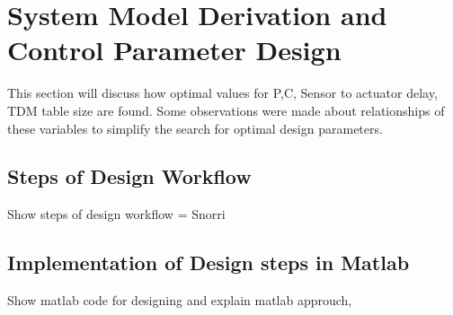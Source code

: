 \section{System Model Derivation and Control Parameter Design}

This section will discuss how optimal values for P,C, Sensor to actuator delay, TDM table size are found. Some observations were made about relationships of these variables to simplify the search for optimal design parameters.

\subsection{Steps of Design Workflow}


 \color{red}
 Show steps of design workflow = Snorri
 \color{black}
 
\subsection{Implementation of Design steps in Matlab}
\color{red}
 Show matlab code for designing and explain matlab approuch,
\color{black}
